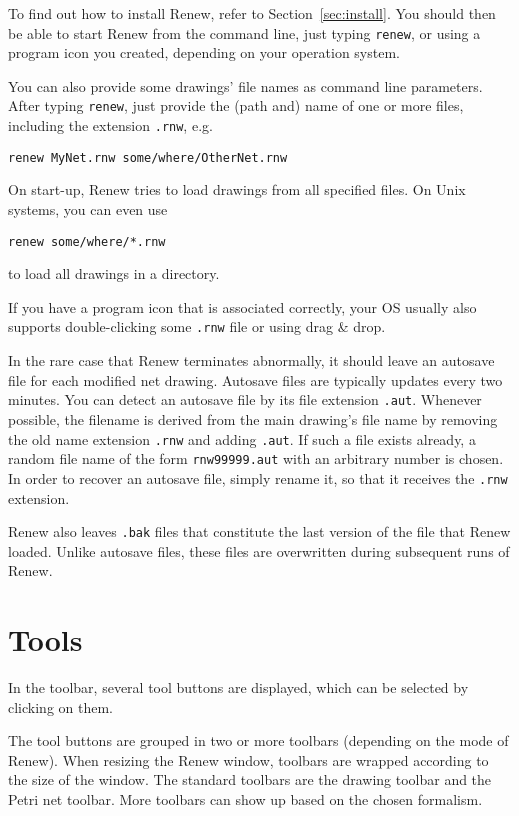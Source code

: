 To find out how to install Renew, refer to Section~\ref{sec:install}.
You should then be able to start Renew from the command line,
just typing \texttt{renew}, or using a program icon you created,
depending on your operation system.

You can also provide some drawings' file names as command line
parameters. After typing \texttt{renew}, just provide the (path and)
name of one or more files, including the extension \texttt{.rnw}, e.g.
\begin{lstlisting}[style=xnonfloating]
  renew MyNet.rnw some/where/OtherNet.rnw
\end{lstlisting}
On start-up, Renew tries to load drawings from all specified files.
On Unix systems, you can even use
\begin{lstlisting}[style=xnonfloating]
  renew some/where/*.rnw
\end{lstlisting}
to load all drawings in a directory.

If you have a program icon that is associated correctly, your OS
usually also supports double-clicking some \texttt{.rnw} file or
using drag \& drop.

In the rare case that Renew terminates abnormally, it should leave
an autosave file for each modified net drawing. Autosave files
are typically updates every two minutes. You can detect an autosave
file by its file extension \texttt{.aut}. Whenever possible,
the filename is derived from the main drawing's file name by
removing the old name extension \texttt{.rnw} and adding
\texttt{.aut}. If such a file exists already, a random file name
of the form \texttt{rnw99999.aut} with an arbitrary number
is chosen. In order to recover an autosave file, simply rename it,
so that it receives the \texttt{.rnw} extension.

Renew also leaves \texttt{.bak} files that constitute the
last version of the file that Renew loaded. Unlike autosave files,
these files are overwritten during subsequent runs of Renew.

\section{Tools}
\label{sec:tools}

In the toolbar, several tool buttons are displayed, which can be selected by
clicking on them.

The tool buttons are grouped in two or more toolbars (depending
on the mode of Renew). When resizing the Renew window, toolbars are
wrapped according to the size of the window.
The standard toolbars are the drawing toolbar and the Petri net
toolbar.
More toolbars can show up based on the chosen formalism.

